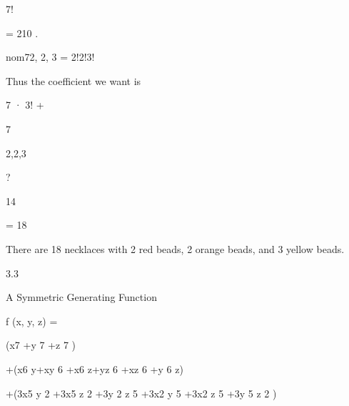 \documentclass[a4paper,portrait,12pt]{article}
\begin{document}
7!


= 210 .


\begin{flushleft}
nom72, 2, 3 = 2!2!3!
\end{flushleft}


\begin{flushleft}
Thus the coefficient we want is
\end{flushleft}


7 · 3! +





7


2,2,3





?





14





= 18





\begin{flushleft}
There are 18 necklaces with 2 red beads, 2 orange beads, and 3 yellow beads.
\end{flushleft}





3.3





\begin{flushleft}
A Symmetric Generating Function
\end{flushleft}





\begin{flushleft}
f (x, y, z) =
\end{flushleft}





\begin{flushleft}
(x7 +y 7 +z 7 )
\end{flushleft}


\begin{flushleft}
+(x6 y+xy 6 +x6 z+yz 6 +xz 6 +y 6 z)
\end{flushleft}


\begin{flushleft}
+(3x5 y 2 +3x5 z 2 +3y 2 z 5 +3x2 y 5 +3x2 z 5 +3y 5 z 2 )
\end{flushleft}
\end{document}
